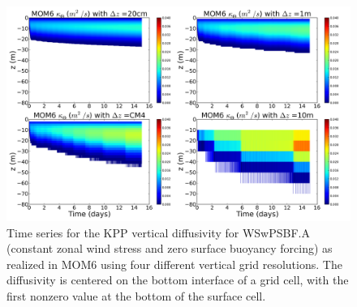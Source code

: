 \begin{figure}[h!t]
\begin{center}
\includegraphics[angle=0,width=14cm]{./figs/MOM6/WSwPSBF_A_MOM6_KPP_diffusivity.png}
\caption[KPP diffusivity from MOM6 for WSwPSBF.A ]{\sf Time series for
  the KPP vertical diffusivity for WSwPSBF.A (constant zonal wind
  stress and zero surface buoyancy forcing) as realized in MOM6 using
  four different vertical grid resolutions.  The diffusivity is
  centered on the bottom interface of a grid cell, with the first
  nonzero value at the bottom of the surface cell.}
\label{fig:WSwPSBF_A_MOM6_KPP_diffusivity}
\end{center}
\end{figure}


